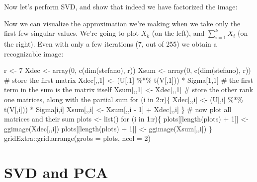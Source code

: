 \documentclass[
  letterpaper,
  DIV=11,
  numbers=noendperiod]{scrreprt}
\newenvironment{Shaded}{\begin{snugshade}}{\end{snugshade}}
\newcommand{\NormalTok}[1]{\textcolor[rgb]{0.00,0.23,0.31}{#1}}
\begin{document}
Now let's perform SVD, and show that indeed we have factorized the
image:

\begin{Shaded}
\end{Shaded}

Now we can visualize the approximation we're making when we take only
the first few singular values. We're going to plot \(X_k\) (on the
left), and \(\sum_{i=1}^k X_i\) (on the right). Even with only a few
iterations (7, out of 255) we obtain a recognizable image:

\begin{Shaded}
\begin{Highlighting}[]
\NormalTok{r \textless{}{-} 7}
\NormalTok{Xdec \textless{}{-} array(0, c(dim(stefano), r))}
\NormalTok{Xsum \textless{}{-} array(0, c(dim(stefano), r))}
\NormalTok{\# store the first matrix}
\NormalTok{Xdec[,,1] \textless{}{-} (U[,1] \%*\% t(V[,1])) * Sigma[1,1]}
\NormalTok{\# the first term in the sum is the matrix itself}
\NormalTok{Xsum[,,1] \textless{}{-} Xdec[,,1]}
\NormalTok{\# store the other rank one matrices, along with the partial sum}
\NormalTok{for (i in 2:r)\{}
\NormalTok{  Xdec[,,i] \textless{}{-} (U[,i] \%*\% t(V[,i])) * Sigma[i,i]}
\NormalTok{  Xsum[,,i] \textless{}{-} Xsum[,,i {-} 1] + Xdec[,,i]}
\NormalTok{\}}
\NormalTok{\# now plot all matrices and their sum}
\NormalTok{plots \textless{}{-} list()}
\NormalTok{for (i in 1:r)\{}
\NormalTok{  plots[[length(plots) + 1]] \textless{}{-} ggimage(Xdec[,,i])}
\NormalTok{  plots[[length(plots) + 1]] \textless{}{-} ggimage(Xsum[,,i])}
\NormalTok{\}}
\NormalTok{gridExtra::grid.arrange(grobs = plots, ncol = 2)}
\end{Highlighting}
\end{Shaded}

\section{SVD and PCA}\label{svd-and-pca}
\end{document}
